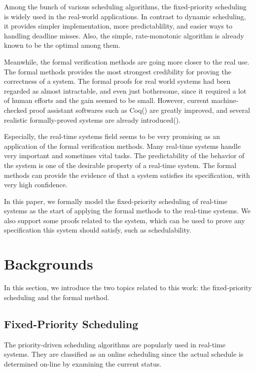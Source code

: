 \documentclass[nocopyrightspace]{sigplanconf}
\begin{document}
Among the bunch of various scheduling algorithms, the fixed-priority scheduling is widely used in the real-world applications. In contrast to dynamic scheduling, it provides simpler implementation, more predictablility, and easier ways to handling deadline misses. Also, the simple, rate-monotonic algorithm is already known to be the optimal among them.

Meanwhile, the formal verification methods are going more closer to the real use. The formal methods provides the most strongest credibility for proving the correctness of a system. The formal proofs for real world systems had been regarded as almost intractable, and even just bothersome, since it required a lot of human efforts and the gain seemed to be small. However, current machine-checked proof assistant softwares such as Coq(\cite{coq}) are greatly improved, and several realistic formally-proved systems are already introduced(\cite{leroy2009formal}).

Especially, the real-time systems field seems to be very promising as an application of the formal verification methods. Many real-time systems handle very important and sometimes vital tasks. The predictability of the behavior of the system is one of the desirable property of a real-time system. The formal methods can provide the evidence of that a system satisfies its specification, with very high confidence.

In this paper, we formally model the fixed-priority scheduling of real-time systems as the start of applying the formal methods to the real-time systems. We also support some proofs related to the system, which can be used to prove any specification this system should satisfy, such as schedulability.

\section{Backgrounds}

In this section, we introduce the two topics related to this work: the fixed-priority scheduling and the formal method.

\subsection{Fixed-Priority Scheduling}

The priority-driven scheduling algorithms are popularly used in real-time systems. They are classified as an online scheduling since the actual schedule is determined on-line by examining the current status.
\end{document}
